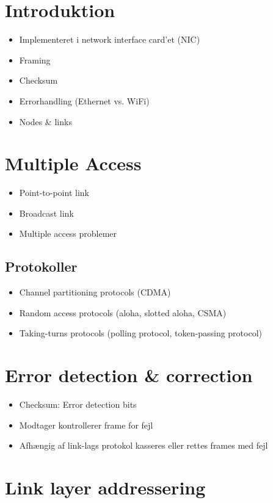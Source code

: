 \section{Introduktion}
\begin{itemize}
	\item Implementeret i network interface card'et (NIC)
	\item Framing
	\item Checksum
	\item Errorhandling (Ethernet vs. WiFi)
	\item Nodes \& links
\end{itemize}

\section{Multiple Access}
\begin{itemize}
	\item Point-to-point link
	\item Broadcast link
	\item Multiple access problemer
\end{itemize}

\subsection{Protokoller}
\begin{itemize}
	\item Channel partitioning protocols (CDMA)
	\item Random access protocols (aloha, slotted aloha, CSMA)
	\item Taking-turns protocols (polling protocol, token-passing protocol)
\end{itemize}

\section{Error detection \& correction}
\begin{itemize}
	\item Checksum: Error detection bits
	\item Modtager kontrollerer frame for fejl
	\item Afhængig af link-lags protokol kasseres eller rettes frames med fejl
\end{itemize}

\section{Link layer addressering}

